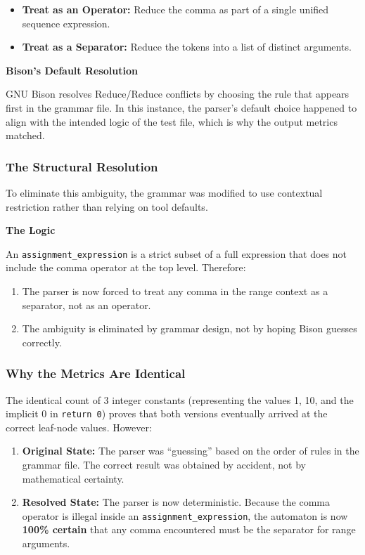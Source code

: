 \documentclass[a4paper,12pt]{article}
\begin{document}
\begin{itemize}
    \item \textbf{Treat as an Operator:} Reduce the comma as part of a single unified sequence expression.
    \item \textbf{Treat as a Separator:} Reduce the tokens into a list of distinct arguments.
\end{itemize}

\vspace{0.4cm}
\textbf{Bison's Default Resolution}

GNU Bison resolves Reduce/Reduce conflicts by choosing the rule that appears first in the grammar file. In this instance, the parser's default choice happened to align with the intended logic of the test file, which is why the output metrics matched.

\subsubsection{The Structural Resolution}

To eliminate this ambiguity, the grammar was modified to use contextual restriction rather than relying on tool defaults.


\vspace{0.4cm}
\textbf{The Logic}

An \texttt{assignment\_expression} is a strict subset of a full expression that does not include the comma operator at the top level. Therefore:

\begin{enumerate}
    \item The parser is now forced to treat any comma in the range context as a separator, not as an operator.
    \item The ambiguity is eliminated by grammar design, not by hoping Bison guesses correctly.
\end{enumerate}

\subsubsection{Why the Metrics Are Identical}

The identical count of 3 integer constants (representing the values 1, 10, and the implicit 0 in \texttt{return 0}) proves that both versions eventually arrived at the correct leaf-node values. However:

\begin{enumerate}
    \item \textbf{Original State:} The parser was ``guessing'' based on the order of rules in the grammar file. The correct result was obtained by accident, not by mathematical certainty.

    \item \textbf{Resolved State:} The parser is now deterministic. Because the comma operator is illegal inside an \texttt{assignment\_expression}, the automaton is now \textbf{100\% certain} that any comma encountered must be the separator for range arguments.
\end{enumerate}
\end{document}

